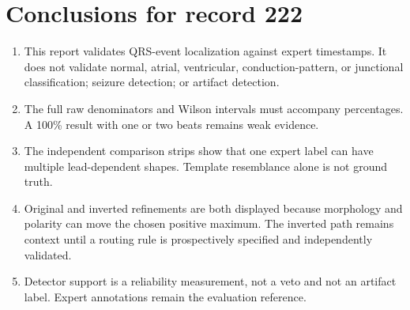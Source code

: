 \documentclass[11pt]{article}
\begin{document}
        \clearpage
        \section{Conclusions for record 222}
        \begin{enumerate}
        \item This report validates QRS-event localization against expert timestamps. It does not validate
        normal, atrial, ventricular, conduction-pattern, or junctional classification;
        seizure detection; or artifact detection.
        \item The full raw denominators and Wilson intervals must accompany percentages. A 100\% result with
        one or two beats remains weak evidence.
        \item The independent comparison strips show that one expert label can have multiple lead-dependent
        shapes. Template resemblance alone is not ground truth.
        \item Original and inverted refinements are both displayed because morphology and polarity can move the
        chosen positive maximum. The inverted path remains context until a routing rule is prospectively specified
        and independently validated.
        \item Detector support is a reliability measurement, not a veto and not an artifact label. Expert
        annotations remain the evaluation reference.
        \end{enumerate}

        
        
        
\end{document}
